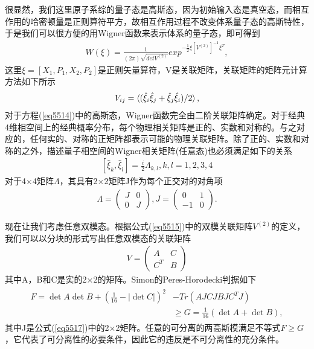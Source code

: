 很显然，我们这里原子系综的量子态是高斯态，因为初始输入态是真空态，而相互作用的哈密顿量是正则算符平方，故相互作用过程不改变体系量子态的高斯特性\cite{simon2000peres}，于是我们可以很方便的用Wigner函数来表示体系的量子态，即可得到
\begin{align}\label{eq5514}
	W(\xi)=\frac{1}{(2\pi)\sqrt{det V^{(2)}}}exp^{{-\frac12\xi[V^{(2)}]^{-1}\xi^T}},
\end{align}
这里$\xi = [{X_1},{P_1},{X_2},{P_2}]$是正则矢量算符，V是关联矩阵，关联矩阵的矩阵元计算方法如下所示\cite{braunstein2005quantum}
\begin{align}\label{eq5515}
	V_{ij}=\braket{(\hat{\xi}_i\hat{\xi}_j+\hat{\xi}_j\hat{\xi}_i)/2},
\end{align}
对于方程(\ref{eq5514})中的高斯态，Wigner函数完全由二阶关联矩阵确定。对于经典4维相空间上的经典概率分布，每个物理相关矩阵是正的、实数和对称的。与之对应的，任何实的、对称的正矩阵都表示可能的物理关联矩阵。除了正的、实数和对称的之外，描述量子相空间的Wigner相关矩阵(任意态)也必须满足如下的关系
\begin{align}\label{eq5516}
	[\hat{\xi}_k,\hat{\xi}_l]=\frac{i}{2}\Lambda_{k,l},k,l=1,2,3,4
\end{align}
对于4×4矩阵$\Lambda$，其具有2×2矩阵J作为每个正交对的对角项
\begin{align}\label{eq5517}
	\Lambda=\left( {\begin{array}{*{20}{cc}}
			J  & 0\\
			0  & J
	\end{array}} \right)
	,J=\left( {\begin{array}{*{20}{cc}}
			0  & 1\\
			-1 & 0
	\end{array}} \right).
\end{align}

现在让我们考虑任意双模态。根据公式(\ref{eq5515})中的双模关联矩阵$V^(2)$的定义，我们可以以分块的形式写出任意双模态的关联矩阵
\begin{align}\label{eq5518}
	V=\left( {\begin{array}{*{20}{cc}}
			A  & C\\
			C^T& B
	\end{array}} \right)
\end{align}
其中A，B和C是实的2×2的矩阵。Simon的Peres-Horodecki判据如下
\begin{align}\label{eq5519}
	\begin{split}
		F=\det{A}\det{B}+(\frac1{16}-|\det{C}|)^2&-Tr(AJCJBJC^TJ)\\
		&\ge G=\frac1{16}(\det{A}+\det{B}),
	\end{split}
\end{align}
其中J是公式(\ref{eq5517})中的2×2矩阵。任意的可分离的两高斯模满足不等式$F\ge G$，它代表了可分离性的必要条件，因此它的违反是不可分离性的充分条件。

